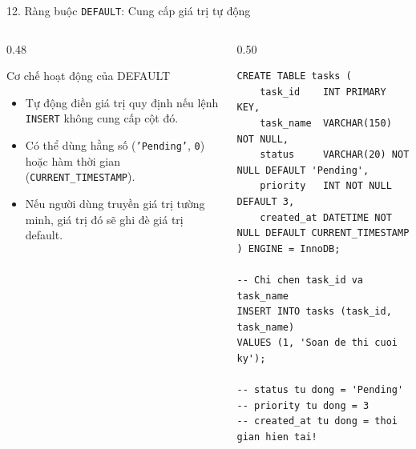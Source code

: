 \documentclass[aspectratio=169,11pt]{beamer}
\begin{document}
\begin{frame}[fragile]{12. Ràng buộc \texttt{DEFAULT}: Cung cấp giá trị tự động}
\begin{columns}[t]
  \begin{column}{0.48\textwidth}
    \begin{block}{Cơ chế hoạt động của DEFAULT}
      \begin{itemize}\setlength{\itemsep}{1.5pt}
        \item Tự động điền giá trị quy định nếu lệnh \texttt{INSERT} không cung cấp cột đó.
        \item Có thể dùng hằng số (\texttt{'Pending'}, \texttt{0}) hoặc hàm thời gian (\texttt{CURRENT\_TIMESTAMP}).
        \item Nếu người dùng truyền giá trị tường minh, giá trị đó sẽ ghi đè giá trị default.
      \end{itemize}
    \end{block}
  \end{column}
  \begin{column}{0.50\textwidth}
\begin{lstlisting}
CREATE TABLE tasks (
    task_id    INT PRIMARY KEY,
    task_name  VARCHAR(150) NOT NULL,
    status     VARCHAR(20) NOT NULL DEFAULT 'Pending',
    priority   INT NOT NULL DEFAULT 3,
    created_at DATETIME NOT NULL DEFAULT CURRENT_TIMESTAMP
) ENGINE = InnoDB;

-- Chi chen task_id va task_name
INSERT INTO tasks (task_id, task_name)
VALUES (1, 'Soan de thi cuoi ky');

-- status tu dong = 'Pending'
-- priority tu dong = 3
-- created_at tu dong = thoi gian hien tai!
\end{lstlisting}
  \end{column}
\end{columns}
\end{frame}
\end{document}

